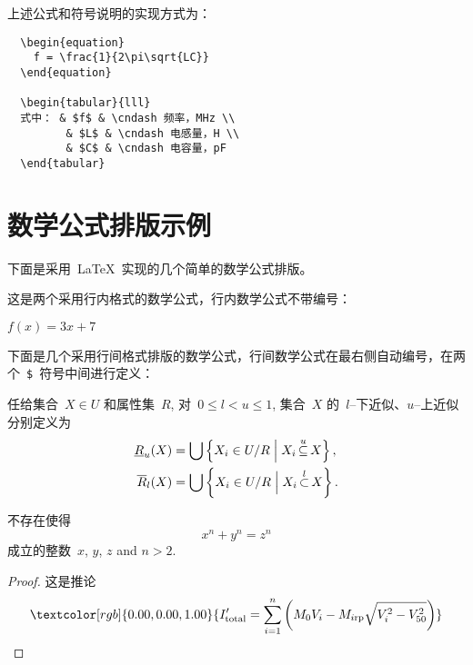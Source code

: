 上述公式和符号说明的实现方式为：

\begin{lstlisting}
  \begin{equation}
    f = \frac{1}{2\pi\sqrt{LC}}
  \end{equation}

  \begin{tabular}{lll}
  式中： & $f$ & \cndash 频率，MHz \\
         & $L$ & \cndash 电感量，H \\
         & $C$ & \cndash 电容量，pF 
  \end{tabular}
\end{lstlisting}

\section{数学公式排版示例}

下面是采用~\LaTeX~实现的几个简单的数学公式排版。

这是两个采用行内格式的数学公式，行内数学公式不带编号：

$f(x) = 3x + 7$

下面是几个采用行间格式排版的数学公式，行间数学公式在最右侧自动编号，在两个~\verb|$|~符号中间进行定义：

\begin{definition}
  任给集合~$X \in U$ 和属性集~$R$, 对~$0\leqslant l < u \leqslant 1$,
  集合~$X$ 的~$l${--}下近似、$u${--}上近似分别定义为
  \begin{align}
    \underline {R} _u (X) & =  \bigcup \left\{ {X_i  \in U/R\Bigm|X_i \mathop  \subseteq \limits^u  X} \right\}, \\
    \overline {R} _l (X)  & =  \bigcup \left\{ {X_i  \in U/R\Bigm|X_i \mathop  \subset \limits^l X} \right\}.
  \end{align}
\end{definition}

\begin{theorem}[\heiti 费马]
  {\upshape\kaishu 不存在使得~
    \begin{equation}
      x^n+y^n=z^n
    \end{equation}
    成立的整数~$x$, $y$, $z$ and $n>2$. }
\end{theorem}

\begin{proof}
  {\upshape\kaishu 这是推论
    \begin{equation}
      \textcolor[rgb]{0.00,0.00,1.00}{
      I'_{{\rm{total}}} = \sum\limits_{i = 1}^n
      {\left( {M_0 V_i - M_{i{\rm{rp}}} \sqrt{V_i^2 - V_{50}^2}}\right)}}
    \end{equation}}
\end{proof}


